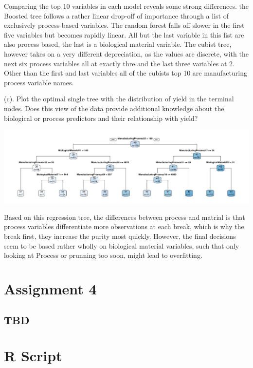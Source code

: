 \documentclass[]{report}
\begin{document}
Comparing the top 10 variables in each model reveals some strong
differences. the Boosted tree follows a rather linear drop-off of
importance through a list of exclusively process-based variables. The
random forest falls off slower in the first five variables but becomes
rapidly linear. All but the last variable in this list are also process
based, the last is a biological material variable. The cubist tree,
however takes on a very different depreciation, as the values are
discrete, with the next six process variables all at exactly thre and
the last three variables at 2. Other than the first and last variables
all of the cubists top 10 are manufacturing process variable names.

\begin{subquestion}{(c).} Plot the optimal single tree with the distribution of yield in the terminal nodes. Does this view of the data provide additional knowledge about the biological or process predictors and their relationship with yield?\end{subquestion}

\includegraphics{Homework-Two_files/figure-latex/kj-8.7c-1.pdf}

Based on this regression tree, the differences between process and
matrial is that process variables differentiate more observations at
each break, which is why the break first, they increase the purity most
quickly. However, the final decisions seem to be based rather wholly on
biological material variables, such that only looking at Process or
prunning too soon, might lead to overfitting.

\hypertarget{AS-4}{%
\chapter*{Assignment 4}\label{AS-4}}

\hypertarget{tbd}{%
\section{TBD}\label{tbd}}

\hypertarget{R-Script}{%
\chapter*{R Script}\label{R-Script}}
\end{document}
